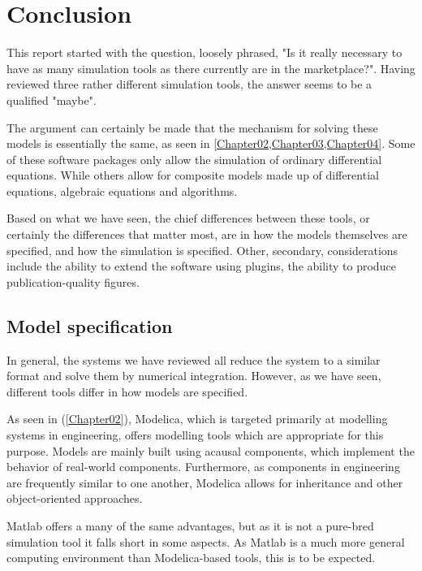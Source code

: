 \documentclass[\rootfolder/main.tex]{subfiles}
\begin{document}
\chapter{Conclusion} %

\label{Chapter06} %

This report started with the question, loosely phrased, "Is it really necessary to have as many simulation tools as there currently are in the marketplace?".
Having reviewed three rather different simulation tools, the answer seems to be a qualified "maybe".

The argument can certainly be made that the mechanism for solving these models is essentially the same, as seen in \cref{Chapter02,Chapter03,Chapter04}.
Some of these software packages only allow the simulation of ordinary differential equations.
While others allow for composite models made up of differential equations, algebraic equations and algorithms.

Based on what we have seen, the chief differences between these tools, or certainly the differences that matter most, are in how the models themselves are specified, and how the simulation is specified.
Other, secondary, considerations include the ability to extend the software using plugins, the ability to produce publication-quality figures.

\section{Model specification}

In general, the systems we have reviewed all reduce the system to a similar format and solve them by numerical integration.
However, as we have seen, different tools differ in how models are specified.

As seen in (\cref{Chapter02}), Modelica, which is targeted primarily at modelling systems in engineering, offers modelling tools which are appropriate for this purpose.
Models are mainly built using acausal components, which implement the behavior of real-world components.
Furthermore, as components in engineering are frequently similar to one another, Modelica allows for inheritance and other object-oriented approaches.

Matlab offers a many of the same advantages, but as it is not a pure-bred simulation tool it falls short in some aspects.
As Matlab is a much more general computing environment than Modelica-based tools, this is to be expected.
\end{document}
